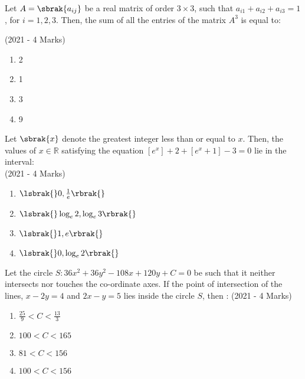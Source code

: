     \item{
        	Let $A=\sbrak{a_{ij}}$ be a real matrix of order $3 \times 3$, such that $a_{i1}+a_{i2}+a_{i3}=1$, for $i=1,2,3$. Then, the sum of all the entries of the matrix $A^3$ is equal to:
        	
             \text{   }\hfill
                {(2021 - 4 Marks)}
				\begin{multicols}{4}
	                \begin{enumerate}
	                   	\item 2
	                   	\item 1
	                   	\item 3
	                   	\item 9
	                \end{enumerate}
				\end{multicols}
        
        }
 \item{
    	
	    	Let $\sbrak{x}$ denote the greatest integer less than or equal to $x$. Then, the values of $x \in \mathbb{R}$ satisfying the equation $[e^x] + 2 + [e^{x}+1] - 3 = 0$ lie in the interval:\\
	    	\text{   }\hfill
	    	{(2021 - 4 Marks)}
	    	\begin{multicols}{4}
	    		\begin{enumerate}
	    			\item $\lsbrak{}0, \frac{1}{e}\rbrak{}$
	    			\item $\lsbrak{} \log_e{2}, \log_e{3}\rbrak{}$
	    			\item $\lsbrak{}1, e\rbrak{}$
	    			\item $\lsbrak{}0, \log_e{2}\rbrak{}$
	    		\end{enumerate}
	    	\end{multicols}
	    	
	    }
    \item{
	
		    Let the circle $S: 36x^2 + 36y^2 - 108x + 120y + C = 0$ be such that it neither intersects nor touches the
		    co-ordinate axes. If the point of intersection of the lines, $x - 2y = 4$ and $2x - y = 5$ lies inside the
		    circle $S$, then :
			\text{   }\hfill
			{(2021 - 4 Marks)}
			\begin{multicols}{4}
				\begin{enumerate}
						\item $\frac{25}{9} < C < \frac{13}{3}$
						\item $100 < C < 165$
						\item $ 81 < C < 156$
						\item $100 < C < 156$
				\end{enumerate}
			\end{multicols}
			
		}

